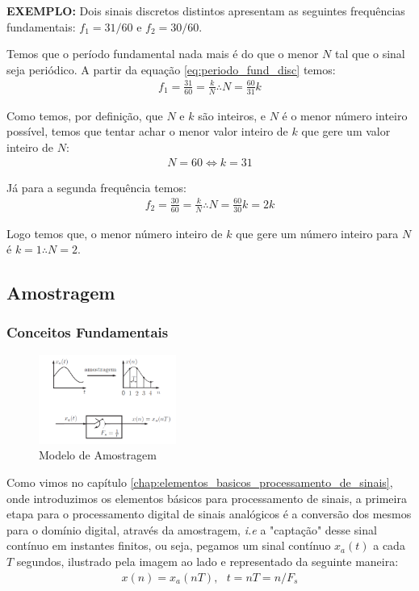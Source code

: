 \documentclass{article}
\begin{document}
\textbf{EXEMPLO:} Dois sinais discretos distintos apresentam as seguintes frequências fundamentais: $f_1=31/60$ e $f_2 = 30/60$.

Temos que o período fundamental nada mais é do que o menor $N$ tal que o sinal seja periódico. A partir da equação \ref{eq:periodo_fund_disc} temos:
\begin{align*}
    f_1 = \frac{31}{60} = \frac{k}{N} \therefore N = \frac{60}{31}k
\end{align*}

Como temos, por definição, que $N$ e $k$ são inteiros, e $N$ é o menor número inteiro possível, temos que tentar achar o menor valor inteiro de $k$ que gere um valor inteiro de $N$:
\begin{align*}
    N = 60 \iff k = 31
\end{align*}

Já para a segunda frequência temos:
\begin{align*}
    f_2 = \frac{30}{60} = \frac{k}{N} \therefore N = \frac{60}{30}k = 2k
\end{align*}

Logo temos que, o menor número inteiro de $k$ que gere um número inteiro para $N$ é $k = 1 \therefore N = 2$.

\subsection{Amostragem}
\label{chap:amostragem}

\subsubsection{Conceitos Fundamentais}

\begin{figure}
\vspace{-20px}
\centering
\includegraphics[width=0.4\textwidth]{imgs/ilustration_sampling.jpeg}
\vspace{-15px}
\caption{Modelo de Amostragem}
\label{img:modelo_de_amostragem}
\end{figure}

Como vimos no capítulo \ref{chap:elementos_basicos_processamento_de_sinais}, onde introduzimos os elementos básicos para processamento de sinais, a primeira etapa para o processamento digital de sinais analógicos é a conversão dos mesmos para o domínio digital, através da amostragem, \emph{i.e} a "captação" desse sinal contínuo em instantes finitos, ou seja, pegamos um sinal contínuo $x_a(t)$ a cada $T$ segundos, ilustrado pela imagem ao lado e representado da seguinte maneira:
\begin{align}
    x(n) = x_a(nT), \ \ \ t=nT=n/F_s
    \label{eq:def_discretizar}
\end{align}
\end{document}
